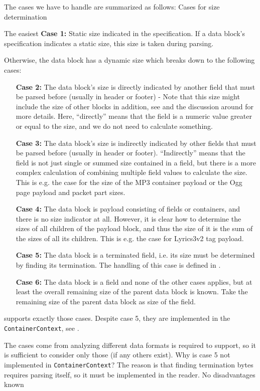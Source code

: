 The cases we have to handle are summarized as follows:
{%
Cases for size determination
}
{%
  The easiest \textbf{Case 1:} Static size indicated in the specification. If a data block's specification indicates a static size, this size is taken during parsing.

  Otherwise, the data block has a dynamic size which breaks down to the following cases:
  \begin{enumerate}
  \item[\textbf{Case 2:}] The data block's size is directly indicated by another field that must be parsed before (usually in header or footer) - Note that this size might include the size of other blocks in addition, see  and the discussion around for more details. Here, ``directly'' means that the field is a numeric value greater or equal to the size, and we do not need to calculate something.
  \item[\textbf{Case 3:}] The data block's size is indirectly indicated by other fields that must be parsed before (usually in header or footer). ``Indirectly'' means that the field is not just single or summed size contained in a field, but there is a more complex calculation of combining multiple field values to calculate the size. This is e.g. the case for the size of the MP3 container payload or the Ogg page payload and packet part sizes.
  \item[\textbf{Case 4:}] The data block is payload consisting of fields or containers, and there is no size indicator at all. However, it is clear how to determine the sizes of all children of the payload block, and thus the size of it is the sum of the sizes of all its children. This is e.g. the case for Lyrics3v2 tag payload.  
  \item[\textbf{Case 5:}] The data block is a terminated field, i.e. its size must be determined by finding its termination. The handling of this case is defined in .
  \item[\textbf{Case 6:}] The data block is a field and none of the other cases applies, but at least the overall remaining size of the parent data block is known. Take the remaining size of the parent data block as size of the field.
  \end{enumerate}

  \LibName{} supports exactly those cases. Despite case 5, they are implemented in the \texttt{ContainerContext}, see .
}
{%
The cases come from analyzing different data formats \LibName{} is required to support, so it is sufficient to consider only those (if any others exist). Why is case 5 not implemented in \texttt{ContainerContext}? The reason is that finding termination bytes requires parsing itself, so it must be implemented in the reader.
}
{%
No disadvantages known
}

